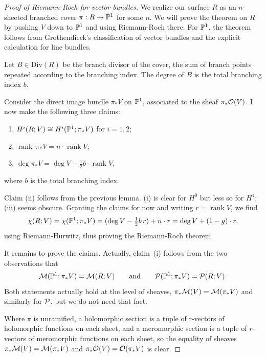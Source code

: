 \documentclass[12pt]{article}
\begin{document}
\begin{proof}
    [Proof of Riemann-Roch for vector bundles]
    We realize our surface $R$ as an $n$-sheeted branched cover
    $\pi : R \to \P^1$ for some $n$.
    We will prove the theorem on $R$ by pushing $V$ down to $\P^1$
    and using Riemann-Roch there. For $\P^1$, the theorem follows from Grothendieck's classification of vector bundles and the explicit calculation for line bundles.

    Let $B \in \mathrm{Div}(R)$ be the branch divisor of the cover, the sum of branch points repeated according to the branching index. The degree of $B$ is the total branching index $b$.

    Consider the direct image bundle $\pi_*V$ on $\P^1$, associated to the sheaf $\pi_*\cO(V)$.
    I now make the following three claims:

    \begin{enumerate}
        \item $H^i(R;V) \cong H^i(\P^1; \pi_*V)$ for $i=1,2$;
        \item $\operatorname{rank}\,\pi_*V = n \cdot \operatorname{rank}V$;
        \item $\deg\pi_*V = \deg V - \tfrac12 b \cdot \operatorname{rank}V$,
    \end{enumerate}
    where $b$ is the total branching index.

    Claim (ii) follows from the previous lemma.
    (i) is clear for $H^0$ but less so for $H^1$;
    (iii) seems obscure.
    Granting the claims for now and writing $r = \operatorname{rank}V$, we find
    \[
        \chi(R;V) = \chi(\P^1;\pi_*V)
        = (\deg V - \tfrac12 b\,r) + n\cdot r
        = \deg V + (1-g)\cdot r,
    \]
    using Riemann-Hurwitz, thus proving the Riemann-Roch theorem.

    It remains to prove the claims.
    Actually, claim~(i) follows from the two observations that
    \[
        \cM(\P^1;\pi_*V) = \cM(R;V)
        \qquad\text{and}\qquad
        \cP(\P^1;\pi_*V) = \cP(R;V).
    \]
    Both statements actually hold at the level of sheaves,
    $\pi_* \cM(V) = \cM(\pi_*V)$ and similarly for $\cP$,
    but we do not need that fact.

    Where $\pi$ is unramified, a holomorphic section is a tuple of r-vectors of holomorphic functions on each sheet, and a meromorphic section is a tuple of $r$-vectors of meromorphic functions on each sheet, so the equality of sheaves $\pi_* \cM(V) = \cM(\pi_*V)$ and $\pi_* \cO(V) = \cO(\pi_*V)$ is clear.


\end{proof}
\end{document}
